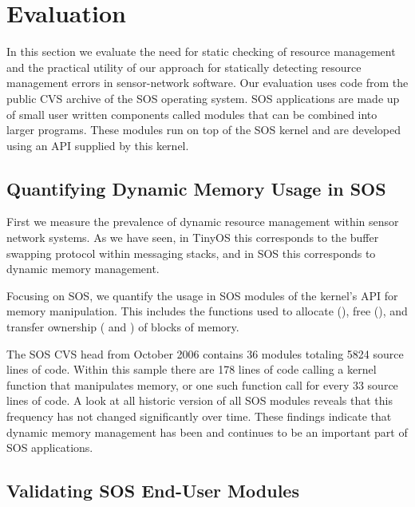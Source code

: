 \section{Evaluation}
\label{sec:eval}



In this section we evaluate the need for static checking of resource
management and the practical utility of our approach for statically
detecting resource management errors in sensor-network software.  
%
Our evaluation uses code from the public CVS archive of the SOS
operating system.
%
SOS applications are made up of small user written components called
modules that can be combined into larger programs.  
%
These modules run on top of the SOS kernel and are developed using an
API supplied by this kernel.



\subsection{Quantifying Dynamic Memory Usage in SOS}



First we measure the prevalence of dynamic resource management within
sensor network systems.  
%
As we have seen, in TinyOS this corresponds to the buffer swapping
protocol within messaging stacks, and in SOS this corresponds to dynamic
memory management.



Focusing on SOS, we quantify the usage in SOS modules of the kernel's
API for memory manipulation.
%
This includes the functions used to allocate (), free
(), and transfer ownership ( and
) of blocks of memory.



The SOS CVS head from October 2006 contains 36 modules totaling 5824 source 
lines of code.  
%
Within this sample there are 178 lines of code
calling a kernel function that manipulates memory, or one such function call
for every 33 source lines of code.  
%
A look at all historic version of all
SOS modules reveals that this frequency has not changed significantly
over time.  
%
These findings indicate that dynamic memory management has been
and continues to be an important part of SOS applications.



\subsection{Validating SOS End-User Modules}



